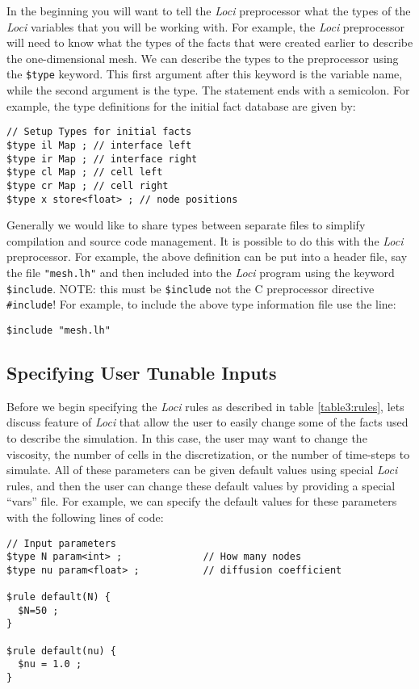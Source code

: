 \documentclass[10pt,epsf,letterpaper,twoside]{book}
\begin{document}
In the beginning you will want to tell the {\it Loci} preprocessor
what the types of the {\it Loci} variables that you will be working
with.  For example, the {\it Loci} preprocessor will need to know what
the types of the facts that were created earlier to describe the
one-dimensional mesh.  We can describe the types to the preprocessor
using the {\tt \$type} keyword.  This first argument after this
keyword is the variable name, while the second argument is the type.
The statement ends with a semicolon.  For example, the type
definitions for the initial fact database are given by:
\begin{verbatim}
// Setup Types for initial facts
$type il Map ; // interface left
$type ir Map ; // interface right
$type cl Map ; // cell left
$type cr Map ; // cell right
$type x store<float> ; // node positions
\end{verbatim}

Generally we would like to share types between separate files to
simplify compilation and source code management.  It is possible to do
this with the {\it Loci} preprocessor.  For example, the above definition
can be put into a header file, say the file {\tt "mesh.lh"} and then
included into the {\it Loci} program using the keyword {\tt \$include}.
NOTE: this must be {\tt \$include} not the C preprocessor directive
{\tt \#include}!  For example, to include the above type information
file use the line:
\begin{verbatim}
$include "mesh.lh"
\end{verbatim}

\subsection{Specifying User Tunable Inputs}
Before we begin specifying the {\it Loci} rules as described in table
\ref{table3:rules}, lets discuss feature of {\it Loci} that allow the user
to easily change some of the facts used to describe the simulation.
In this case, the user may want to change the viscosity, the number of
cells in the discretization, or the number of time-steps to simulate.
All of these parameters can be given default values using special {\it Loci}
rules, and then the user can change these default values by providing
a special ``vars'' file.  For example, we can specify the default
values for these parameters with the following lines of code:
\newpage
\begin{verbatim}
// Input parameters
$type N param<int> ;              // How many nodes
$type nu param<float> ;           // diffusion coefficient

$rule default(N) {
  $N=50 ;
}

$rule default(nu) {
  $nu = 1.0 ;
}
\end{verbatim}
\end{document}

